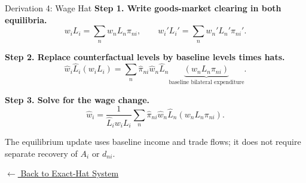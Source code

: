 \documentclass[aspectratio=169,11pt]{beamer}
\newcommand{\B}[1]{\textcolor{blue1}{\textbf{#1}}}
\newcommand{\wh}[1]{\widehat{#1}}
\newcommand{\backlink}[2]{%
  \hyperlink{#1}{\textcolor{blue1}{\footnotesize
  \(\longleftarrow\) #2}}}
\begin{document}
\begin{frame}[t,label=deriveHatWage]{Derivation 4: Wage Hat}
  \footnotesize
  \B{Step 1. Write goods-market clearing in both equilibria.}
  \[
    w_iL_i=\sum_nw_nL_n\pi_{ni},
    \qquad
    w_i'L_i'=\sum_nw_n'L_n'\pi_{ni}'.
  \]

  \B{Step 2. Replace counterfactual levels by baseline levels times hats.}
  \[
    \wh w_i\wh L_i(w_iL_i)
    =\sum_n\wh\pi_{ni}\wh w_n\wh L_n
      \underbrace{(w_nL_n\pi_{ni})}_{\text{baseline bilateral expenditure}}.
  \]

  \B{Step 3. Solve for the wage change.}
  \[
    \wh w_i
    =\frac{1}{\wh L_iw_iL_i}
      \sum_n\wh\pi_{ni}\wh w_n\wh L_n
      (w_nL_n\pi_{ni}).
  \]

  The equilibrium update uses baseline income and trade flows; it does not require
  separate recovery of \(A_i\) or \(d_{ni}\).

  \vfill
  \hfill\backlink{mainHatSystem}{Back to Exact-Hat System}
\end{frame}
\end{document}

